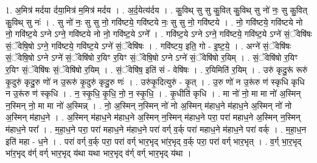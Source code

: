 \documentclass[17pt]{extarticle}
\begin{document}
1. अ॒मित्र॑ मर्दया र्दया॒मित्र॑ म॒मित्र॑ मर्दय । . अ॒र्द॒येत्य॑र्दय । . कु॒विथ् सु सु कु॒वित् कु॒विथ् सु नो॑ नः॒ सु कु॒वित् कु॒विथ् सु नः॑ । . सु नो॑ नः॒ सु सु नो॒ गवि॑ष्टये॒ गवि॑ष्टये नः॒ सु सु नो॒ गवि॑ष्टये । . नो॒ गवि॑ष्टये॒ गवि॑ष्टये नो नो॒ गवि॑ष्ट॒ये ऽग्ने ऽग्ने॒ गवि॑ष्टये नो नो॒ गवि॑ष्ट॒ये ऽग्ने᳚ । . गवि॑ष्ट॒ये ऽग्ने ऽग्ने॒ गवि॑ष्टये॒ गवि॑ष्ट॒ये ऽग्ने॑ सं॒ॅवेषि॑षः सं॒ॅवेषि॒षो ऽग्ने॒ गवि॑ष्टये॒ गवि॑ष्ट॒ये ऽग्ने॑ सं॒ॅवेषि॑षः । . गवि॑ष्टय॒ इति॒ गो - इ॒ष्ट॒ये॒ । . अग्ने॑ सं॒ॅवेषि॑षः सं॒ॅवेषि॒षो ऽग्ने ऽग्ने॑ सं॒ॅवेषि॑षो र॒यिꣳ र॒यिꣳ सं॒ॅवेषि॒षो ऽग्ने ऽग्ने॑ सं॒ॅवेषि॑षो र॒यिम् । . सं॒ॅवेषि॑षो र॒यिꣳ र॒यिꣳ सं॒ॅवेषि॑षः सं॒ॅवेषि॑षो र॒यिम् । . सं॒ॅवेषि॑ष॒ इति॑ सं - वेषि॑षः । . र॒यिमिति॑ र॒यिम् । . उरु॑ कृदु॒रू॑ रूरु॑ कृ॒दुरु॑ कृदु॒रु णो॑ न उ॒रूरु॑ कृ॒दुरु॑ कृदु॒रु णः॑ । . उरु॑कृ॒दित्युरु॑ - कृ॒त् । . उ॒रु णो॑ न उ॒रू॑रु ण॑ स्कृधि कृधि न उ॒रू॑रु ण॑ स्कृधि । . न॒ स्कृ॒धि॒ कृ॒धि॒ नो॒ न॒ स्कृ॒धि॒ । . कृ॒धीति॑ कृधि । . मा नो॑ नो॒ मा मा नो॑ अ॒स्मिन् न॒स्मिन् नो॒ मा मा नो॑ अ॒स्मिन्न् । . नो॒ अ॒स्मिन् न॒स्मिन् नो॑ नो अ॒स्मिन् म॑हाध॒ने म॑हाध॒ने अ॒स्मिन् नो॑ नो अ॒स्मिन् म॑हाध॒ने । . अ॒स्मिन् म॑हाध॒ने म॑हाध॒ने अ॒स्मिन् न॒स्मिन् म॑हाध॒ने परा॒ परा॑ महाध॒ने अ॒स्मिन् न॒स्मिन् म॑हाध॒ने परा᳚ । . म॒हा॒ध॒ने परा॒ परा॑ महाध॒ने म॑हाध॒ने परा॑ वर्ग् व॒र्क् परा॑ महाध॒ने म॑हाध॒ने परा॑ वर्क् । . म॒हा॒ध॒न इति॑ महा - ध॒ने । . परा॑ वर्ग् व॒र्क् परा॒ परा॑ वर्ग् भार॒भृद् भा॑र॒भृद् व॒र्क् परा॒ परा॑ वर्ग् भार॒भृत् । . व॒र्ग् भा॒र॒भृद् भा॑र॒भृद् व॑र्ग् वर्ग् भार॒भृद् य॑था यथा भार॒भृद् व॑र्ग् वर्ग् भार॒भृद् य॑था । \newline
\end{document}
